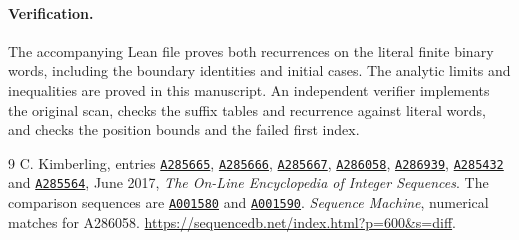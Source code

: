 \documentclass[10pt]{article}
\newcommand{\oeisentry}[1]{\href{https://oeis.org/#1}{\texttt{#1}}}
\begin{document}
\paragraph{Verification.}
The accompanying Lean file proves both recurrences on the literal finite binary words,
including the boundary identities and initial cases. The analytic limits and inequalities
are proved in this manuscript. An independent verifier implements the original scan,
checks the suffix tables and recurrence against literal words, and checks the position
bounds and the failed first index.

\begin{thebibliography}{9}
 C. Kimberling, entries \oeisentry{A285665}, \oeisentry{A285666}, \oeisentry{A285667},
\oeisentry{A286058}, \oeisentry{A286939}, \oeisentry{A285432} and \oeisentry{A285564}, June 2017,
\emph{The On-Line Encyclopedia of Integer Sequences}. The comparison sequences are
\oeisentry{A001580} and \oeisentry{A001590}.
 \emph{Sequence Machine}, numerical matches for A286058.\newline
\url{https://sequencedb.net/index.html?p=600&s=diff}.
\end{thebibliography}
\end{document}
